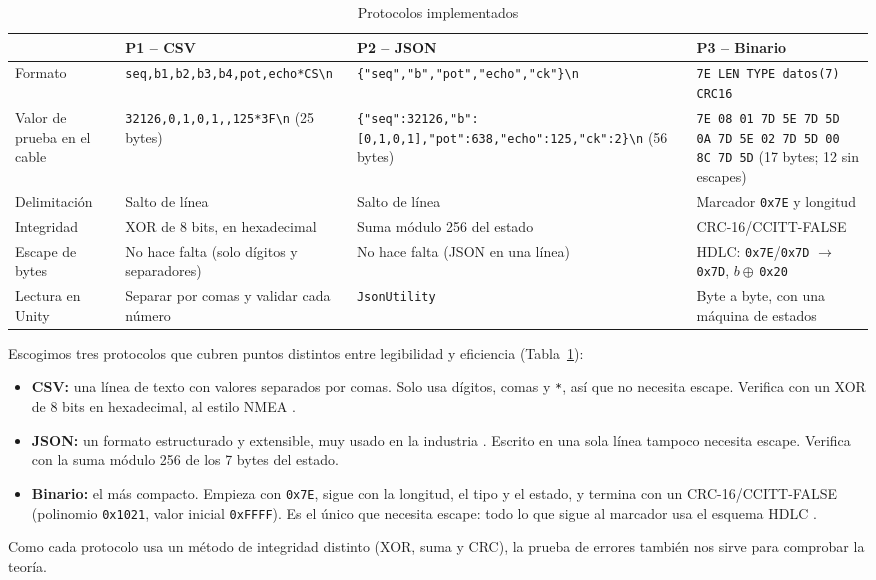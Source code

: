 \documentclass[journal]{IEEEtran}
\begin{document}
\begin{table}[!t]
\renewcommand{\arraystretch}{1.25}
\caption{Protocolos implementados}
\label{tab:protocolos}
\centering
\footnotesize
\begin{tabular}{>{\raggedright\arraybackslash}p{2.4cm}>{\raggedright\arraybackslash}p{4.3cm}>{\raggedright\arraybackslash}p{5.0cm}>{\raggedright\arraybackslash}p{4.3cm}}
\hline
 & \textbf{P1 -- CSV} & \textbf{P2 -- JSON} & \textbf{P3 -- Binario} \\
\hline
Formato & \texttt{seq,\allowbreak b1,\allowbreak b2,\allowbreak b3,\allowbreak b4,\allowbreak pot,\allowbreak echo*CS\textbackslash n} & \texttt{\{"seq",\allowbreak "b",\allowbreak "pot",\allowbreak "echo",\allowbreak "ck"\}\textbackslash n} & \texttt{7E LEN TYPE datos(7) CRC16} \\
Valor de prueba en el cable & \texttt{32126,0,1,0,1,\allowbreak 638,125*3F\textbackslash n} (25 bytes) & \texttt{\{"seq":32126,\allowbreak "b":[0,1,0,1],\allowbreak "pot":638,\allowbreak "echo":125,\allowbreak "ck":2\}\textbackslash n} (56 bytes) & \texttt{7E 08 01 7D 5E 7D 5D 0A 7D 5E 02 7D 5D 00 8C 7D 5D} (17 bytes; 12 sin escapes) \\
Delimitación & Salto de línea & Salto de línea & Marcador \texttt{0x7E} y longitud \\
Integridad & XOR de 8 bits, en hexadecimal & Suma módulo 256 del estado & CRC-16/CCITT-FALSE \\
Escape de bytes & No hace falta (solo dígitos y separadores) & No hace falta (JSON en una línea) & HDLC: \texttt{0x7E}/\texttt{0x7D} $\rightarrow$ \texttt{0x7D}, $b \oplus$\,\texttt{0x20} \\
Lectura en Unity & Separar por comas y validar cada número & \texttt{JsonUtility} & Byte a byte, con una máquina de estados \\
\hline
\end{tabular}
\end{table}

Escogimos tres protocolos que cubren puntos distintos entre legibilidad y eficiencia (Tabla~\ref{tab:protocolos}):
\begin{itemize}
    \item \textbf{CSV:} una línea de texto con valores separados por comas. Solo usa dígitos, comas y \texttt{*}, así que no necesita escape. Verifica con un XOR de 8 bits en hexadecimal, al estilo NMEA \cite{nmea}.
    \item \textbf{JSON:} un formato estructurado y extensible, muy usado en la industria \cite{rfc8259}. Escrito en una sola línea tampoco necesita escape. Verifica con la suma módulo 256 de los 7 bytes del estado.
    \item \textbf{Binario:} el más compacto. Empieza con \texttt{0x7E}, sigue con la longitud, el tipo y el estado, y termina con un CRC-16/CCITT-FALSE (polinomio \texttt{0x1021}, valor inicial \texttt{0xFFFF}). Es el único que necesita escape: todo lo que sigue al marcador usa el esquema HDLC \cite{rfc1662}.
\end{itemize}
Como cada protocolo usa un método de integridad distinto (XOR, suma y CRC), la prueba de errores también nos sirve para comprobar la teoría.
\end{document}
